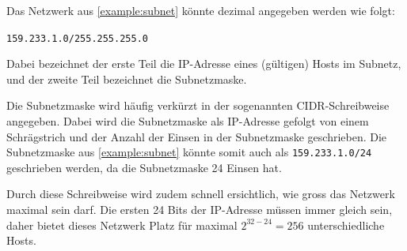 \begin{mydefinition}
Das Netzwerk aus \cref{example:subnet} könnte dezimal angegeben werden wie folgt: 

\texttt{159.233.1.0/255.255.255.0}

Dabei bezeichnet der erste Teil die \gls{IP}-Adresse eines (gültigen) Hosts im Subnetz, und der zweite Teil bezeichnet die Subnetzmaske. 

Die Subnetzmaske wird häufig verkürzt in der sogenannten \gls{CIDR}-Schreibweise angegeben. Dabei wird die Subnetzmaske als \gls{IP}-Adresse gefolgt von einem Schrägstrich und der Anzahl der Einsen in der Subnetzmaske geschrieben. Die Subnetzmaske aus \cref{example:subnet} könnte somit auch als \texttt{159.233.1.0/24} geschrieben werden, da die Subnetzmaske 24 Einsen hat. 

Durch diese Schreibweise wird zudem schnell ersichtlich, wie gross das Netzwerk maximal sein darf. Die ersten 24 Bits der \gls{IP}-Adresse müssen immer gleich sein, daher bietet dieses Netzwerk Platz für maximal $2^{32-24} = 256$ unterschiedliche Hosts.
\end{mydefinition}


